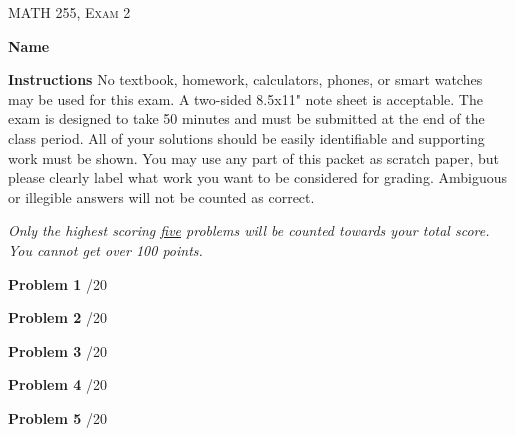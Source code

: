 \documentclass[12pt]{amsbook}
\begin{document}





\begin{center}
   \textsc{\large MATH 255, Exam 2}\\
\end{center}
\vspace{1cm}

\textbf{Name} \; \underline{\hspace{8cm}}

\vspace{1cm}

\textbf{Instructions} \; No textbook, homework, calculators, phones, or smart watches may be used for this exam. A two-sided 8.5x11" note sheet is acceptable.  The exam is designed to take 50 minutes and must be submitted at the end of the class period. All of your solutions should be easily identifiable and supporting work must be shown. You may use any part of this packet as scratch paper, but please clearly label what work you want to be considered for grading. Ambiguous or illegible answers will not be counted as correct.

\emph{Only the highest scoring \underline{five} problems will be counted towards your total score. You cannot get over 100 points.}

\vspace{1cm}

\textbf{Problem 1} \; \underline{\hspace{1cm}}/20

\vspace{.25cm}

\textbf{Problem 2} \; \underline{\hspace{1cm}}/20

\vspace{.25cm}

\textbf{Problem 3} \; \underline{\hspace{1cm}}/20

\vspace{.25cm}

\textbf{Problem 4} \; \underline{\hspace{1cm}}/20

\vspace{.25cm}

\textbf{Problem 5} \; \underline{\hspace{1cm}}/20

\vspace{.25cm}
\end{document}
